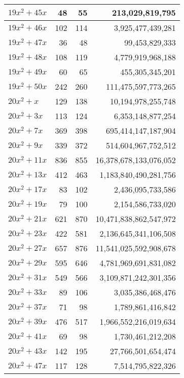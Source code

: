\documentclass[a4paper]{amsproc}
\theoremstyle{plain}
\begin{document}
\begin{longtable}{ | l | r | r | r | }
$19x^2 + 45x$ & 48 & 55 & 213{,}029{,}819{,}795 \\ \hline
$19x^2 + 46x$ & 102 & 114 & 3{,}925{,}477{,}439{,}281 \\ \hline
$19x^2 + 47x$ & 36 & 48 & 99{,}453{,}829{,}333 \\ \hline
$19x^2 + 48x$ & 108 & 119 & 4{,}779{,}919{,}968{,}188 \\ \hline
$19x^2 + 49x$ & 60 & 65 & 455{,}305{,}345{,}201 \\ \hline
$19x^2 + 50x$ & 242 & 260 & 111{,}475{,}597{,}773{,}265 \\ \hline
$20x^2 + x$ & 129 & 138 & 10{,}194{,}978{,}255{,}748 \\ \hline
$20x^2 + 3x$ & 113 & 124 & 6{,}353{,}148{,}877{,}254 \\ \hline
$20x^2 + 7x$ & 369 & 398 & 695{,}414{,}147{,}187{,}904 \\ \hline
$20x^2 + 9x$ & 339 & 372 & 514{,}604{,}967{,}752{,}512 \\ \hline
$20x^2 + 11x$ & 836 & 855 & 16{,}378{,}678{,}133{,}076{,}052 \\ \hline
$20x^2 + 13x$ & 412 & 463 & 1{,}183{,}840{,}490{,}281{,}756 \\ \hline
$20x^2 + 17x$ & 83 & 102 & 2{,}436{,}095{,}733{,}586 \\ \hline
$20x^2 + 19x$ & 79 & 100 & 2{,}154{,}586{,}733{,}020 \\ \hline
$20x^2 + 21x$ & 621 & 870 & 10{,}471{,}838{,}862{,}547{,}972 \\ \hline
$20x^2 + 23x$ & 422 & 581 & 2{,}136{,}645{,}341{,}106{,}508 \\ \hline
$20x^2 + 27x$ & 657 & 876 & 11{,}541{,}025{,}592{,}908{,}678 \\ \hline
$20x^2 + 29x$ & 595 & 646 & 4{,}781{,}969{,}691{,}831{,}082 \\ \hline
$20x^2 + 31x$ & 549 & 566 & 3{,}109{,}871{,}242{,}301{,}356 \\ \hline
$20x^2 + 33x$ & 89 & 106 & 3{,}035{,}386{,}468{,}476 \\ \hline
$20x^2 + 37x$ & 71 & 98 & 1{,}789{,}861{,}416{,}842 \\ \hline
$20x^2 + 39x$ & 476 & 517 & 1{,}966{,}552{,}216{,}019{,}634 \\ \hline
$20x^2 + 41x$ & 69 & 98 & 1{,}730{,}461{,}212{,}208 \\ \hline
$20x^2 + 43x$ & 142 & 195 & 27{,}766{,}501{,}654{,}474 \\ \hline
$20x^2 + 47x$ & 117 & 128 & 7{,}514{,}795{,}822{,}326 \\ \hline

\end{longtable}
\end{document}
